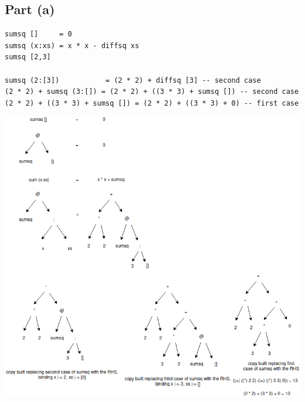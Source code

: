 \documentclass[11pt]{article}
\begin{document}
\subsection{Part (a)}
\label{sec:org11ea6e6}
\begin{verbatim}
sumsq []     = 0
sumsq (x:xs) = x * x - diffsq xs
sumsq [2,3]

sumsq (2:[3])           = (2 * 2) + diffsq [3] -- second case
(2 * 2) + sumsq (3:[]) = (2 * 2) + ((3 * 3) + sumsq []) -- second case
(2 * 2) + ((3 * 3) + sumsq []) = (2 * 2) + ((3 * 3) + 0) -- first case
\end{verbatim}
\begin{center}
\includegraphics[width=160mm]{./sumsq-xs.png}
\end{center}
\end{document}
